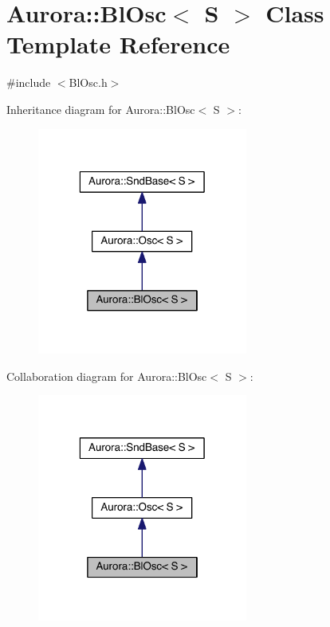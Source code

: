 \hypertarget{class_aurora_1_1_bl_osc}{}\section{Aurora\+:\+:Bl\+Osc$<$ S $>$ Class Template Reference}
\label{class_aurora_1_1_bl_osc}


{\ttfamily \#include $<$Bl\+Osc.\+h$>$}



Inheritance diagram for Aurora\+:\+:Bl\+Osc$<$ S $>$\+:\nopagebreak
\begin{figure}[H]
\begin{center}
\leavevmode
\includegraphics[width=196pt]{class_aurora_1_1_bl_osc__inherit__graph}
\end{center}
\end{figure}


Collaboration diagram for Aurora\+:\+:Bl\+Osc$<$ S $>$\+:\nopagebreak
\begin{figure}[H]
\begin{center}
\leavevmode
\includegraphics[width=196pt]{class_aurora_1_1_bl_osc__coll__graph}
\end{center}
\end{figure}
